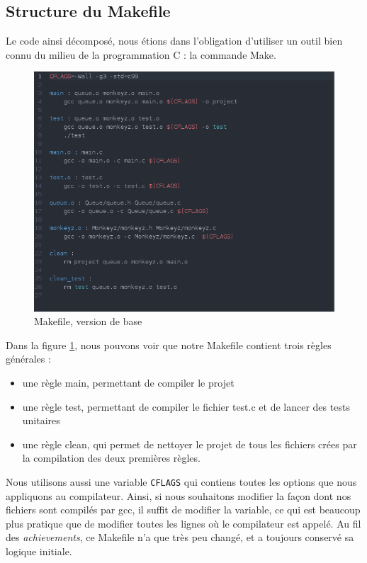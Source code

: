 \documentclass{article}
\begin{document}
\subsection{Structure du Makefile}
Le code ainsi décomposé, nous étions dans l'obligation d'utiliser un outil bien connu du milieu de la programmation C : la commande Make.
\begin{figure}[h]
    \centering
    \includegraphics[width=\linewidth]{makefilebase.png}
    \caption{Makefile, version de base}
    \label{fig:makefilebase}
\end{figure}

Dans la figure \ref{fig:makefilebase}, nous pouvons voir que notre Makefile contient trois règles générales : 
\begin{itemize}
    \item une règle main, permettant de compiler le projet
    \item une règle test, permettant de compiler le fichier test.c et de lancer des tests unitaires
    \item une règle clean, qui permet de nettoyer le projet de tous les fichiers crées par la compilation des deux premières règles.
\end{itemize}
Nous utilisons aussi une variable \verb'CFLAGS' qui contiens toutes les options que nous appliquons au compilateur. Ainsi, si nous souhaitons modifier la façon dont nos fichiers sont compilés par gcc, il suffit de modifier la variable, ce qui est beaucoup plus pratique que de modifier toutes les lignes où le compilateur est appelé.
Au fil des \emph{achievements}, ce Makefile n'a que très peu changé, et a toujours conservé sa logique initiale.
\end{document}
